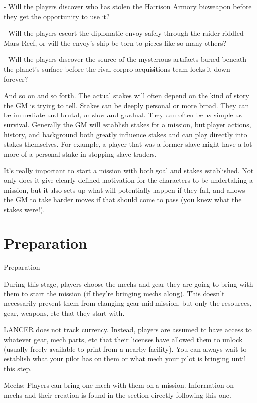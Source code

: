      -   Will the players discover who has stolen the Harrison Armory bioweapon before they get  
         the opportunity to use it?
 
     -   Will the players escort the diplomatic envoy safely through the raider riddled Mars Reef,  
         or will the envoy’s ship be torn to pieces like so many others?
 
     -   Will the players discover the source of the mysterious artifacts buried beneath the  
         planet’s surface before the rival corpro acquisitions team locks it down forever?
 

And so on and so forth. The actual stakes will often depend on the kind of story the GM is trying  
to tell. Stakes can be deeply personal or more broad. They can be immediate and brutal, or slow  
and gradual. They can often be as simple as survival. Generally the GM will establish stakes for a  
mission, but player actions, history, and background both greatly influence stakes and can play  
directly into stakes themselves. For example, a player that was a former slave might have a lot  
more of a personal stake in stopping slave traders.
 

It’s really important to start a mission with both goal and stakes established. Not only does it  
give clearly defined motivation for the characters to be undertaking a mission, but it also sets up  
what will potentially happen if they fail, and allows the GM to take harder moves if that should  
come to pass (you knew what the stakes were!).
 
\chapter{Preparation}
                                                Preparation
 

During this stage, players choose the mechs and gear they are going to bring with them to start  
the mission (if they’re bringing mechs along). This doesn’t necessarily prevent them from  
changing gear mid-mission, but only the resources, gear, weapons, etc that they start with.
 

LANCER does not track currency. Instead, players are assumed to have access to whatever gear,  
mech parts, etc that their licenses have allowed them to unlock (usually freely available to print  
from a nearby facility). You can always wait to establish what your pilot has on them or what  
mech your pilot is bringing until this step.
 

Mechs: Players can bring one mech with them on a mission. Information on mechs and their  
creation is found in the section directly following this one.
 
